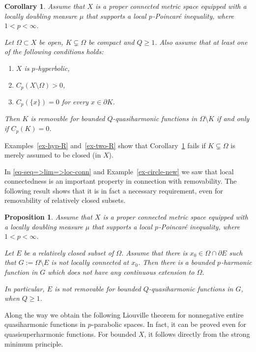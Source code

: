 \documentclass[a4paper,twoside]{article}
\theoremstyle{propositional}
\newtheorem{prop}[thm]{Proposition}
\newtheorem{cor}[thm]{Corollary}
\theoremstyle{descriptive}
\theoremstyle{remarkstyle}
\newcommand{\setm}{\setminus}
\renewcommand{\subsetneq}{\varsubsetneq}
\newcommand{\Cp}{{C_p}}
\newcommand{\bdry}{\partial}
\newcommand{\bdy}{\bdry}
\newcommand{\Om}{\Omega}
\newcommand{\p}{{$p\mspace{1mu}$}}
\numberwithin{equation}{section}
\begin{document}
\begin{cor} \label{cor-remove-K-from-X-hyp}
Assume that   $X$ is a proper connected metric space
equipped with a locally doubling measure $\mu$ that
supports a local \p-Poincar\'e inequality, where $1<p<\infty$.

Let $\Om \subset X$ be open, 
 $K \subsetneq \Om$ be compact and $Q\ge1$.
Also assume that at least one of the following conditions holds\/\textup:
\begin{enumerate}
\renewcommand{\theenumi}{\textup{(\arabic{enumi})}}%
\item 
$X$ is \p-hyperbolic,
\item
$\Cp(X\setm \Om)>0$,
\item
$\Cp(\{x\})=0$ for every $x \in \bdy K$.
\end{enumerate}
Then $K$ is removable for bounded $Q$-quasiharmonic functions in $\Om \setm K$
if and only if $\Cp(K)=0$.
\end{cor}

Examples~\ref{ex-hyp-R} and~\ref{ex-two-R} show that
Corollary~\ref{cor-remove-K-from-X-hyp}
fails if $K\subsetneq \Om$ is merely assumed to be closed (in $X$).


In \eqref{eq-seq=>lim=>loc-conn} and Example~\ref{ex-circle-new}
we saw that local connectedness is an important property in
connection with removability.
The following result shows that it is in fact
a necessary requirement, even for 
removability of relatively closed subsets.

\begin{prop} \label{prop-not-locconn}
Assume that   $X$ is a proper connected metric space
equipped with a locally doubling measure $\mu$ that
supports a local \p-Poincar\'e inequality, where $1<p<\infty$.

Let $E$ be a relatively closed subset of $\Om$.
Assume that there is $x_0 \in \Om \cap \bdy E$ 
such that $G:=\Om\setm E$ is not locally connected at $x_0$. 
Then there is a bounded \p-harmonic function in $G$
which does not have any continuous extension to $\Om$.

In particular, $E$ is not removable for bounded 
$Q$-quasiharmonic functions in $G$, when $Q \ge 1$.
\end{prop}





Along the way we obtain the following Liouville theorem
for nonnegative entire quasiharmonic functions
in \p-parabolic spaces.
In fact, it can be proved even for
quasisuperharmonic functions.
For bounded $X$, it follows directly from the strong minimum principle.
\end{document}
